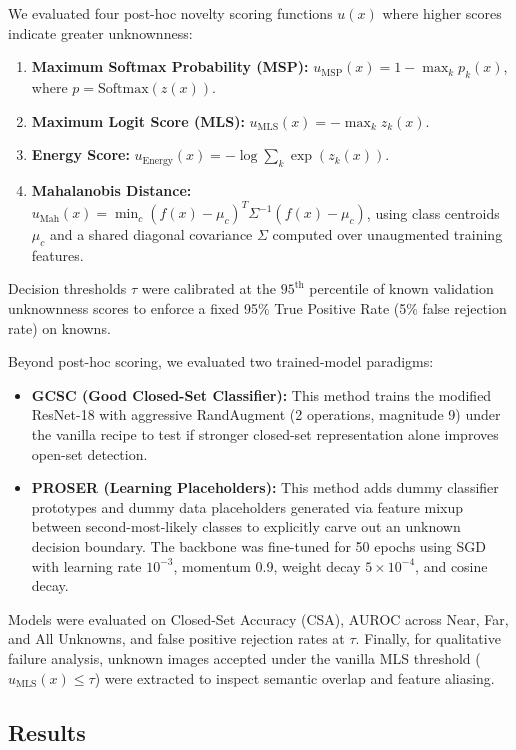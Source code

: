 \documentclass{article}
\begin{document}
We evaluated four post-hoc novelty scoring functions $u(x)$ where higher scores indicate greater unknownness:
\begin{enumerate}
    \item \textbf{Maximum Softmax Probability (MSP):} $u_{\text{MSP}}(x) = 1 - \max_k p_k(x)$, where $p = \text{Softmax}(z(x))$.
    \item \textbf{Maximum Logit Score (MLS):} $u_{\text{MLS}}(x) = -\max_k z_k(x)$.
    \item \textbf{Energy Score:} $u_{\text{Energy}}(x) = -\log \sum_k \exp(z_k(x))$.
    \item \textbf{Mahalanobis Distance:} $u_{\text{Mah}}(x) = \min_c (f(x) - \mu_c)^T \Sigma^{-1} (f(x) - \mu_c)$, using class centroids $\mu_c$ and a shared diagonal covariance $\Sigma$ computed over unaugmented training features.
\end{enumerate}
Decision thresholds $\tau$ were calibrated at the $95^{\text{th}}$ percentile of known validation unknownness scores to enforce a fixed 95\% True Positive Rate (5\% false rejection rate) on knowns.

Beyond post-hoc scoring, we evaluated two trained-model paradigms:
\begin{itemize}
    \item \textbf{GCSC (Good Closed-Set Classifier):} This method trains the modified ResNet-18 with aggressive RandAugment (2 operations, magnitude 9) under the vanilla recipe to test if stronger closed-set representation alone improves open-set detection.
    \item \textbf{PROSER (Learning Placeholders):} This method adds dummy classifier prototypes and dummy data placeholders generated via feature mixup between second-most-likely classes to explicitly carve out an unknown decision boundary. The backbone was fine-tuned for 50 epochs using SGD with learning rate $10^{-3}$, momentum 0.9, weight decay $5 \times 10^{-4}$, and cosine decay.
\end{itemize}

Models were evaluated on Closed-Set Accuracy (CSA), AUROC across Near, Far, and All Unknowns, and false positive rejection rates at $\tau$. Finally, for qualitative failure analysis, unknown images accepted under the vanilla MLS threshold ($u_{\text{MLS}}(x) \le \tau$) were extracted to inspect semantic overlap and feature aliasing.

\subsection{Results}
\end{document}
